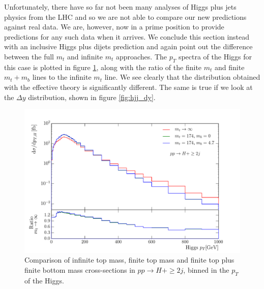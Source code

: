 Unfortunately, there have so far not been many analyses of Higgs plus jets physics from the LHC and so we are not able to compare our new predictions against real data. We are, however, now in a prime position to provide predictions for any such data when it arrives. We conclude this section instead with an inclusive Higgs plus dijets prediction and again point out the difference between the full $m_t$ and infinite $m_t$ approaches. The $p_T$ spectra of the Higgs for this case is plotted in figure \ref{fig:hjj_ptH}, along with the ratio of the finite $m_t$ and finite $m_t + m_b$ lines to the infinite $m_t$ line. We see clearly that the distribution obtained with the effective theory is significantly different. The same is true if we look at the $\Delta y$ distribution, shown in figure \ref{fig:hjj_dy}. 

\begin{figure}[t]
\centering
\includegraphics[scale=0.64]{Images/Higgs_Plots/pth_compare_all.pdf}
\caption{Comparison of infinite top mass, finite top mass and finite top plus finite bottom mass cross-sections in $pp \to H+\geq2j$, binned in the $p_T$ of the Higgs.}
\label{fig:hjj_ptH}
\end{figure}

